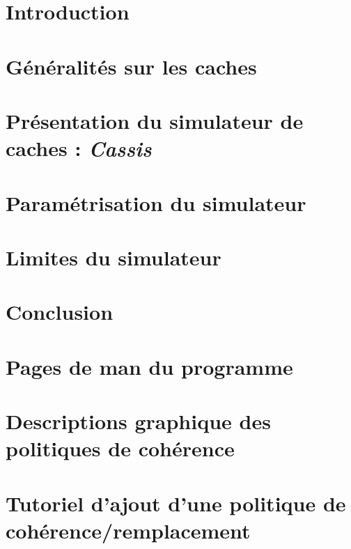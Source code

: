 \documentclass[a4paper]{report}
\begin{document}


\newpage
\tableofcontents

\renewcommand{\labelitemi}{$\bullet$}

\newpage
\chapter*{Introduction}

\newpage
\chapter{Généralités sur les caches}

\newpage
\chapter{Présentation du simulateur de caches : \emph{Cassis}}

\newpage
\chapter{Paramétrisation du simulateur}

\newpage
\chapter{Limites du simulateur}

\newpage
\chapter*{Conclusion}

\newpage
\appendix
\chapter{Pages de man du programme}

\chapter{Descriptions graphique des politiques de cohérence}

\chapter{Tutoriel d'ajout d'une politique de cohérence/remplacement}

\newpage
{}
\nocite{*}


\end{document}

